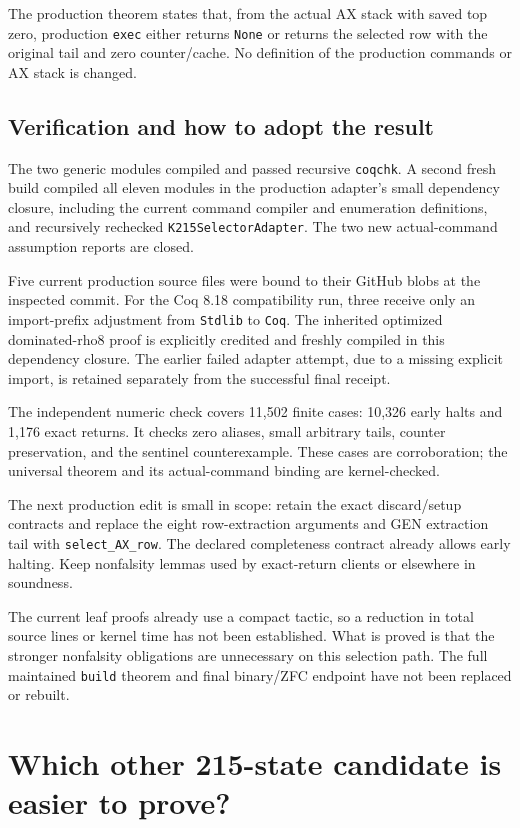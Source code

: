 \documentclass[11pt]{article}
\newcommand{\code}[1]{\texttt{#1}}
\theoremstyle{remark}
\begin{document}
The production theorem states that, from the actual AX stack with saved
top zero, production \code{exec} either returns \code{None} or returns the
selected row with the original tail and zero counter/cache. No definition
of the production commands or AX stack is changed.

\subsection{Verification and how to adopt the result}

The two generic modules compiled and passed recursive \code{coqchk}.
A second fresh build compiled all eleven modules in the production adapter's
small dependency closure, including the current command compiler and
enumeration definitions, and recursively rechecked
\code{K215SelectorAdapter}. The two new actual-command assumption reports
are closed.

Five current production source files were bound to their GitHub blobs at
the inspected commit. For the Coq 8.18 compatibility run, three receive
only an import-prefix adjustment from \code{Stdlib} to \code{Coq}.
The inherited optimized dominated-rho8 proof is explicitly credited and
freshly compiled in this dependency closure. The earlier failed adapter
attempt, due to a missing explicit import, is retained separately from the
successful final receipt.

The independent numeric check covers 11,502 finite cases: 10,326 early
halts and 1,176 exact returns. It checks zero aliases, small arbitrary tails,
counter preservation, and the sentinel counterexample. These cases are
corroboration; the universal theorem and its actual-command binding are
kernel-checked.

The next production edit is small in scope: retain the exact discard/setup
contracts and replace the eight row-extraction arguments and GEN extraction
tail with \code{select\_AX\_row}. The declared completeness contract already
allows early halting. Keep nonfalsity lemmas used by exact-return clients
or elsewhere in soundness.

The current leaf proofs already use a compact tactic, so a reduction in
total source lines or kernel time has not been established. What is
proved is that the stronger nonfalsity obligations are unnecessary on
this selection path. The full maintained \code{build} theorem and final
binary/ZFC endpoint have not been replaced or rebuilt.


\section{Which other 215-state candidate is easier to prove?}
\label{sec:alternatives}
\end{document}
